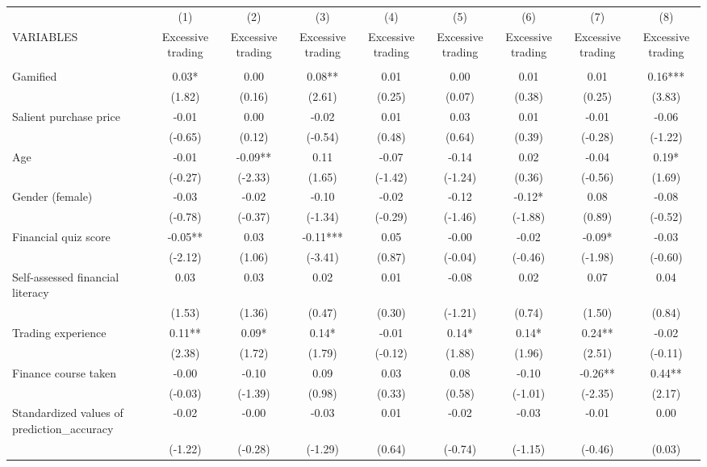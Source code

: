 \documentclass[]{article}
\begin{document}
\begin{tabular}{lcccccccc} \hline
 & (1) & (2) & (3) & (4) & (5) & (6) & (7) & (8) \\
VARIABLES & Excessive trading & Excessive trading & Excessive trading & Excessive trading & Excessive trading & Excessive trading & Excessive trading & Excessive trading \\ \hline
 &  &  &  &  &  &  &  &  \\
Gamified & 0.03* & 0.00 & 0.08** & 0.01 & 0.00 & 0.01 & 0.01 & 0.16*** \\
 & (1.82) & (0.16) & (2.61) & (0.25) & (0.07) & (0.38) & (0.25) & (3.83) \\
Salient purchase price & -0.01 & 0.00 & -0.02 & 0.01 & 0.03 & 0.01 & -0.01 & -0.06 \\
 & (-0.65) & (0.12) & (-0.54) & (0.48) & (0.64) & (0.39) & (-0.28) & (-1.22) \\
Age & -0.01 & -0.09** & 0.11 & -0.07 & -0.14 & 0.02 & -0.04 & 0.19* \\
 & (-0.27) & (-2.33) & (1.65) & (-1.42) & (-1.24) & (0.36) & (-0.56) & (1.69) \\
Gender (female) & -0.03 & -0.02 & -0.10 & -0.02 & -0.12 & -0.12* & 0.08 & -0.08 \\
 & (-0.78) & (-0.37) & (-1.34) & (-0.29) & (-1.46) & (-1.88) & (0.89) & (-0.52) \\
Financial quiz score & -0.05** & 0.03 & -0.11*** & 0.05 & -0.00 & -0.02 & -0.09* & -0.03 \\
 & (-2.12) & (1.06) & (-3.41) & (0.87) & (-0.04) & (-0.46) & (-1.98) & (-0.60) \\
Self-assessed financial literacy & 0.03 & 0.03 & 0.02 & 0.01 & -0.08 & 0.02 & 0.07 & 0.04 \\
 & (1.53) & (1.36) & (0.47) & (0.30) & (-1.21) & (0.74) & (1.50) & (0.84) \\
Trading experience & 0.11** & 0.09* & 0.14* & -0.01 & 0.14* & 0.14* & 0.24** & -0.02 \\
 & (2.38) & (1.72) & (1.79) & (-0.12) & (1.88) & (1.96) & (2.51) & (-0.11) \\
Finance course taken & -0.00 & -0.10 & 0.09 & 0.03 & 0.08 & -0.10 & -0.26** & 0.44** \\
 & (-0.03) & (-1.39) & (0.98) & (0.33) & (0.58) & (-1.01) & (-2.35) & (2.17) \\
Standardized values of prediction\_accuracy & -0.02 & -0.00 & -0.03 & 0.01 & -0.02 & -0.03 & -0.01 & 0.00 \\
 & (-1.22) & (-0.28) & (-1.29) & (0.64) & (-0.74) & (-1.15) & (-0.46) & (0.03) \\

\end{tabular}
\end{document}
